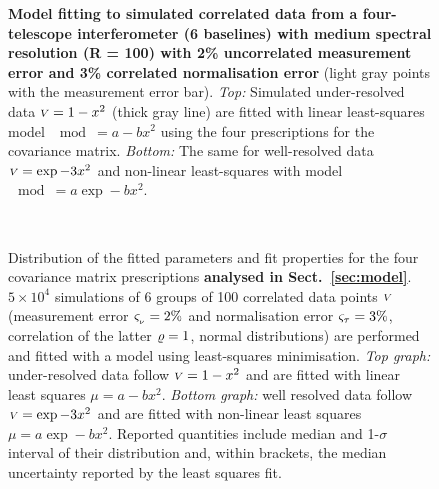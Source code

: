 \documentclass{pasa}
\def\correction#1{{\bfseries #1}}
\begin{document}
\begin{figure}
\caption{\correction{Model fitting to simulated correlated data from a four-telescope interferometer (6 baselines) with medium spectral resolution (R = 100) with 2\% uncorrelated measurement error and 3\% correlated normalisation error} (light gray points with the measurement error bar).  \emph{Top:} Simulated under-resolved data ${\scriptstyle V} = 1-x^2$ (thick gray line) are fitted with linear least-squares model $\mod = a-bx^2$ using the four prescriptions for the covariance matrix. \emph{Bottom:} The same for well-resolved data ${\scriptstyle V} = \exp -3x^2$ and non-linear least-squares with model $\mod = a\exp -bx^2$.}
\end{figure}

\begin{figure}
\centering
{}\\
\caption{Distribution of the fitted parameters and fit properties for the four covariance matrix prescriptions \correction{analysed in Sect.~\ref{sec:model}}. $5\times10^4$ simulations of 6 groups of 100 correlated data points ${\scriptstyle V}$ (measurement error $\varsigma_{_\nu} = 2\%$ and normalisation error $\varsigma_\tau = 3\%$, correlation of the latter $\varrho = 1$, normal distributions) are performed and fitted with a model using least-squares minimisation. \emph{Top graph:} under-resolved data follow ${\scriptstyle V} = 1-x^2$ and are fitted with linear least squares $\mu = a - bx^2$. \emph{Bottom graph:} well resolved data follow ${\scriptstyle V} = \exp -3x^2$ and are fitted with non-linear least squares $\mu = a\exp -bx^2$. Reported quantities include median and 1-$\sigma$ interval of their distribution and, within brackets, the median uncertainty reported by the least squares fit. 
}
\end{figure}
\end{document}
